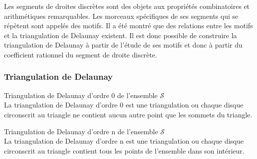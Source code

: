 Les segments de droites discrètes sont des objets aux propriétés combinatoires et arithmétiques remarquables. Les morceaux spécifiques de ses segments qui se répètent sont appelés des motifs. Il a été montré que des relations entre les motifs et la triangulation de Delaunay existent. Il est donc possible de construire la triangulation de Delaunay à partir de l'étude de ses motifs et donc à partir du coefficient rationnel du segment de droite discrète.

\subsubsection{Triangulation de Delaunay}


\begin{Definition}{Triangulation de Delaunay d'ordre 0 de l'ensemble $\mathcal{S}$}\\
\label{def:tri-del-0}
  La triangulation de Delaunay d'ordre 0 est une triangulation ou chaque disque circonscrit au triangle ne contient aucun autre point que les sommets du triangle.
\end{Definition}

\begin{Definition}{Triangulation de Delaunay d'ordre n de l'ensemble $\mathcal{S}$}\\
\label{def:tri-del-n}
  La triangulation de Delaunay d'ordre n est une triangulation ou chaque disque circonscrit au triangle contient tous les points de l'ensemble dans son intérieur.
\end{Definition}


